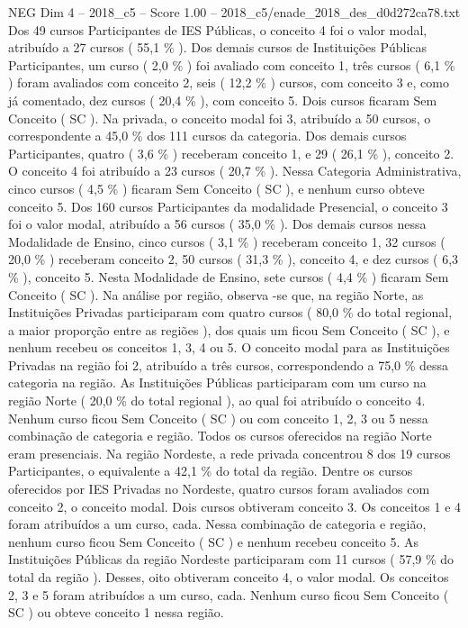 \begin{textsample}{NEG Dim 4 – 2018\_c5 – Score 1.00 – 2018\_c5/enade\_2018\_des\_d0d272ca78.txt}
Dos 49 cursos Participantes de IES Públicas, o conceito 4 foi o valor modal, atribuído a 27 cursos ( 55,1 \% ).
Dos demais cursos de Instituições Públicas Participantes, um curso ( 2,0 \% ) foi avaliado com conceito 1, três cursos ( 6,1 \% ) foram avaliados com conceito 2, seis ( 12,2 \% ) cursos, com conceito 3 e, como já comentado, dez cursos ( 20,4 \% ), com conceito 5.
Dois cursos ficaram Sem Conceito ( SC ).
Na privada, o conceito modal foi 3, atribuído a 50 cursos, o correspondente a 45,0 \% dos 111 cursos da categoria.
Dos demais cursos Participantes, quatro ( 3,6 \% ) receberam conceito 1, e 29 ( 26,1 \% ), conceito 2.
O conceito 4 foi atribuído a 23 cursos ( 20,7 \% ).
Nessa Categoria Administrativa, cinco cursos ( 4,5 \% ) ficaram Sem Conceito ( SC ), e nenhum curso obteve conceito 5.
Dos 160 cursos Participantes da modalidade Presencial, o conceito 3 foi o valor modal, atribuído a 56 cursos ( 35,0 \% ).
Dos demais cursos nessa Modalidade de Ensino, cinco cursos ( 3,1 \% ) receberam conceito 1, 32 cursos ( 20,0 \% ) receberam conceito 2, 50 cursos ( 31,3 \% ), conceito 4, e dez cursos ( 6,3 \% ), conceito 5.
Nesta Modalidade de Ensino, sete cursos ( 4,4 \% ) ficaram Sem Conceito ( SC ).
Na análise por região, observa -se que, na região Norte, as Instituições Privadas participaram com quatro cursos ( 80,0 \% do total regional, a maior proporção entre as regiões ), dos quais um ficou Sem Conceito ( SC ), e nenhum recebeu os conceitos 1, 3, 4 ou 5.
O conceito modal para as Instituições Privadas na região foi 2, atribuído a três cursos, correspondendo a 75,0 \% dessa categoria na região.
As Instituições Públicas participaram com um curso na região Norte ( 20,0 \% do total regional ), ao qual foi atribuído o conceito 4.
Nenhum curso ficou Sem Conceito ( SC ) ou com conceito 1, 2, 3 ou 5 nessa combinação de categoria e região.
Todos os cursos oferecidos na região Norte eram presenciais.
Na região Nordeste, a rede privada concentrou 8 dos 19 cursos Participantes, o equivalente a 42,1 \% do total da região.
Dentre os cursos oferecidos por IES Privadas no Nordeste, quatro cursos foram avaliados com conceito 2, o conceito modal.
Dois cursos obtiveram conceito 3.
Os conceitos 1 e 4 foram atribuídos a um curso, cada.
Nessa combinação de categoria e região, nenhum curso ficou Sem Conceito ( SC ) e nenhum recebeu conceito 5.
As Instituições Públicas da região Nordeste participaram com 11 cursos ( 57,9 \% do total da região ).
Desses, oito obtiveram conceito 4, o valor modal.
Os conceitos 2, 3 e 5 foram atribuídos a um curso, cada.
Nenhum curso ficou Sem Conceito ( SC ) ou obteve conceito 1 nessa região.

\end{textsample}
